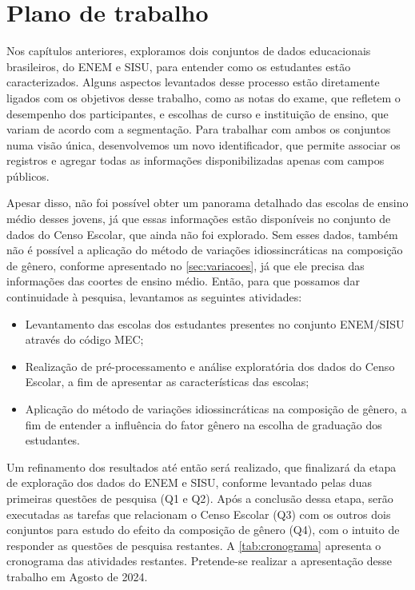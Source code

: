 \chapter{Plano de trabalho}
\label{cap:plano-trabalho}

Nos capítulos anteriores, exploramos dois conjuntos de dados educacionais brasileiros, do ENEM e SISU, para entender como os estudantes estão caracterizados. Alguns aspectos levantados desse processo estão diretamente ligados com os objetivos desse trabalho, como as notas do exame, que refletem o desempenho dos participantes, e escolhas de curso e instituição de ensino, que variam de acordo com a segmentação. Para trabalhar com ambos os conjuntos numa visão única, desenvolvemos um novo identificador, que permite associar os registros e agregar todas as informações disponibilizadas apenas com campos públicos. 

Apesar disso, não foi possível obter um panorama detalhado das escolas de ensino médio desses jovens, já que essas informações estão disponíveis no conjunto de dados do Censo Escolar, que ainda não foi explorado. Sem esses dados, também não é possível a aplicação do método de variações idiossincráticas na composição de gênero, conforme apresentado no \autoref{sec:variacoes}, já que ele precisa das informações das coortes de ensino médio. Então, para que possamos dar continuidade à pesquisa, levantamos as seguintes atividades:

\begin{itemize}
    \item Levantamento das escolas dos estudantes presentes no conjunto ENEM/SISU através do código MEC;
    \item Realização de pré-processamento e análise exploratória dos dados do Censo Escolar, a fim de apresentar as características das escolas;
    \item Aplicação do método de variações idiossincráticas na composição de gênero, a fim de  entender a influência do fator gênero na escolha de graduação dos estudantes.
\end{itemize}

  Um refinamento dos resultados até então será realizado, que finalizará da etapa de exploração dos dados do ENEM e SISU, conforme levantado pelas duas primeiras questões de pesquisa (Q1 e Q2). Após a conclusão dessa etapa, serão executadas as tarefas que relacionam o Censo Escolar (Q3) com os outros dois conjuntos para estudo do efeito da composição de gênero (Q4), com o intuito de responder as questões de pesquisa restantes. A \autoref{tab:cronograma} apresenta o cronograma das atividades restantes. Pretende-se realizar a apresentação desse trabalho em Agosto de 2024.

